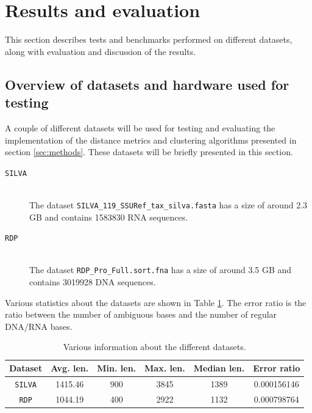 \section{Results and evaluation} \label{sec:results}

This section describes tests and benchmarks performed on different datasets,
along with evaluation and discussion of the results.

\subsection{Overview of datasets and hardware used for testing}
\label{sec:overview_of_datasets}

A couple of different datasets will be used for testing and evaluating the
implementation of the distance metrics and clustering algorithms presented in
section \ref{sec:methods}. These datasets will be briefly presented in this
section.

\begin{description}
  \item[\texttt{SILVA}] \hfill \\
    The dataset \texttt{SILVA\_119\_SSURef\_tax\_silva.fasta} has a size of
    around 2.3 GB and contains \num{1583830} RNA sequences.

  \item[\texttt{RDP}] \hfill \\
    The dataset \texttt{RDP\_Pro\_Full.sort.fna} has a size of around 3.5 GB
    and contains \num{3019928} DNA sequences.
\end{description}

Various statistics about the datasets are shown in Table \ref{tab:data_stats}.
The error ratio is the ratio between the number of ambiguous bases and the
number of regular DNA/RNA bases.

\begin{table}[H]
  \centering
  \begin{tabular}{c | c | c | c | c | c}
    Dataset        & Avg. len. & Min. len. & Max. len. & Median len. & Error ratio \\
    \hline\hline
    \texttt{SILVA} & \num{1415.46}  & \num{900} & \num{3845} & \num{1389} & 0.000156146 \\
    \texttt{RDP}   & \num{1044.19}  & \num{400} & \num{2922} & \num{1132} & 0.000798764 \\
  \end{tabular}
  \caption{Various information about the different datasets.}
  \label{tab:data_stats}
\end{table}

